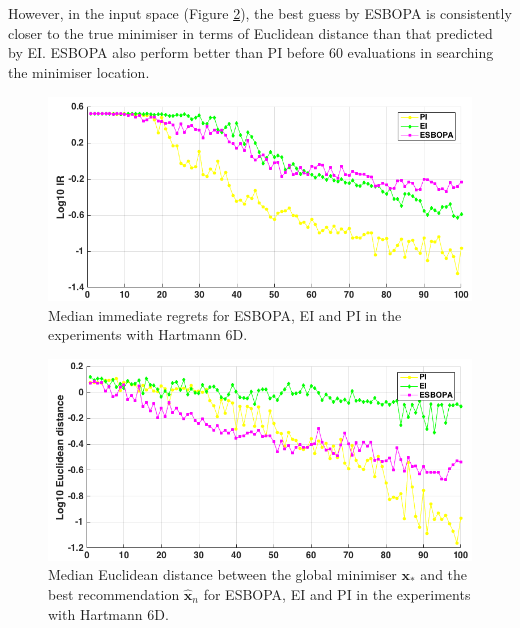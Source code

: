 \documentclass[a4paper,11pt]{report}
\begin{document}
\\\\
However, in the input space (Figure \ref{6DHartXnorm}), the best guess by ESBOPA is consistently closer to the true minimiser in terms of Euclidean distance than that predicted by EI. ESBOPA also perform better than PI before 60 evaluations in searching the minimiser location. 
\\
\begin{figure} [H] \label{6DHartIR}
	\centering
	 \includegraphics[width=0.8\linewidth]{Hartmann6D_ESBOPAV4_IR.png}
\caption{ Median immediate regrets for ESBOPA, EI and PI in the experiments with Hartmann 6D.}
\end{figure}

\begin{figure} [H]
\label{6DHartXnorm}
	\centering
	 \includegraphics[width=0.8\linewidth]{Hartmann6D_ESBOPAV4_1_X_norm.png}
\caption{ Median Euclidean distance between the global minimiser $\mathbf{x}_{*}$ and the best recommendation $ \hat{\mathbf{x}}_{n}$ for ESBOPA, EI and PI in the experiments with Hartmann 6D.}
\end{figure}
\end{document}
